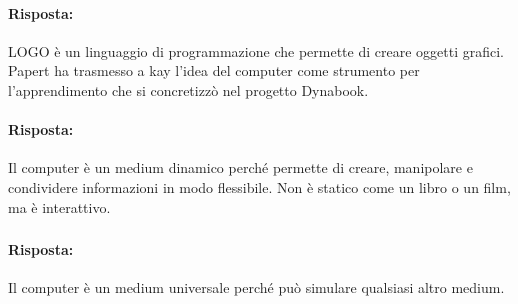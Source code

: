 
\paragraph{Risposta:} LOGO è un linguaggio di programmazione che permette di creare oggetti grafici.
Papert ha trasmesso a kay l'idea del computer come strumento per l'apprendimento che si 
concretizzò nel progetto Dynabook.


\paragraph{Risposta:} Il computer è un medium dinamico perché permette di creare, manipolare e condividere informazioni in modo flessibile.
Non è statico come un libro o un film, ma è interattivo.

\subsubsection{}


\paragraph{Risposta:} Il computer è un medium universale perché può simulare 
qualsiasi altro medium.
